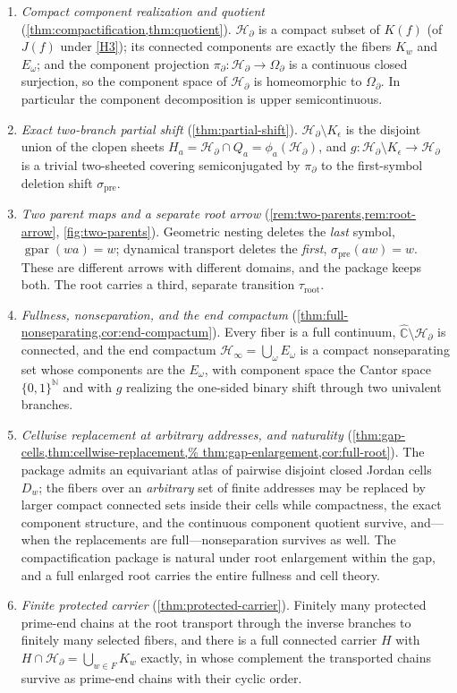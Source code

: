 \documentclass[11pt,reqno]{amsart}
\numberwithin{equation}{section}
\theoremstyle{plain}
\theoremstyle{definition}
\theoremstyle{remark}
\DeclareMathOperator{\gpar}{gpar}
\newcommand{\Chat}{\widehat{\mathbb C}}
\newcommand{\N}{\mathbb N}
\newcommand{\OmB}{\Omega_\partial}
\newcommand{\HB}{\mathcal H_\partial}
\newcommand{\HE}{\mathcal H_\infty}
\newcommand{\spre}{\sigma_{\mathrm{pre}}}
\newcommand{\troot}{\tau_{\mathrm{root}}}
\newcommand{\rootK}{K_{\epsilon}}
\newcommand{\projB}{\pi_\partial}
\begin{document}
\begin{enumerate}[label=(\Roman*),leftmargin=3em]
 \item \emph{Compact component realization and quotient}
  (\cref{thm:compactification,thm:quotient}).  $\HB$ is a compact
  subset of $K(f)$ (of $J(f)$ under \ref{H3}); its connected components
  are exactly the fibers $K_w$ and $E_\omega$; and the component
  projection $\projB\colon\HB\to\OmB$ is a continuous closed
  surjection, so the component space of $\HB$ is homeomorphic to
  $\OmB$.  In particular the component decomposition is upper
  semicontinuous.
 \item \emph{Exact two-branch partial shift}
  (\cref{thm:partial-shift}).  $\HB\setminus\rootK$ is the disjoint
  union of the clopen sheets $H_a=\HB\cap Q_a=\phi_a(\HB)$, and
  $g\colon\HB\setminus\rootK\to\HB$ is a trivial two-sheeted covering
  semiconjugated by $\projB$ to the first-symbol deletion shift
  $\spre$.
 \item \emph{Two parent maps and a separate root arrow}
  (\cref{rem:two-parents,rem:root-arrow}, \cref{fig:two-parents}).
  Geometric nesting deletes the \emph{last} symbol, $\gpar(wa)=w$;
  dynamical transport deletes the \emph{first}, $\spre(aw)=w$.  These
  are different arrows with different domains, and the package keeps
  both.  The root carries a third, separate transition $\troot$.
 \item \emph{Fullness, nonseparation, and the end compactum}
  (\cref{thm:full-nonseparating,cor:end-compactum}).  Every fiber is a
  full continuum, $\Chat\setminus\HB$ is connected, and the end
  compactum $\HE=\bigcup_\omega E_\omega$ is a compact nonseparating
  set whose components are the $E_\omega$, with component space the
  Cantor space $\{0,1\}^{\N}$ and with $g$ realizing the one-sided
  binary shift through two univalent branches.
 \item \emph{Cellwise replacement at arbitrary addresses, and
  naturality} (\cref{thm:gap-cells,thm:cellwise-replacement,%
thm:gap-enlargement,cor:full-root}).  The package admits an equivariant
  atlas of pairwise disjoint closed Jordan cells $D_w$; the fibers over
  an \emph{arbitrary} set of finite addresses may be replaced by larger
  compact connected sets inside their cells while compactness, the
  exact component structure, and the continuous component quotient
  survive, and---when the replacements are full---nonseparation
  survives as well.  The compactification package is natural under root
  enlargement within the gap, and a full enlarged root carries the
  entire fullness and cell theory.
 \item \emph{Finite protected carrier}
  (\cref{thm:protected-carrier}).  Finitely many protected prime-end
  chains at the root transport through the inverse branches to finitely
  many selected fibers, and there is a full connected carrier $H$ with
  $H\cap\HB=\bigcup_{w\in F}K_w$ exactly, in whose complement the
  transported chains survive as prime-end chains with their cyclic
  order.
\end{enumerate}
\end{document}
